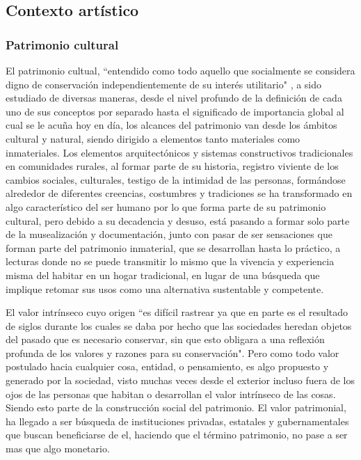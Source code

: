 \subsection{Contexto artístico}
\subsubsection{Patrimonio cultural}
El patrimonio cultual, ``entendido como todo aquello que socialmente se considera digno de conservación independientemente de su interés utilitario" \citep{prats1998concepto}, a sido estudiado de diversas maneras, desde el nivel profundo de la definición de cada uno de sus conceptos por separado hasta el significado de importancia global al cual se le acuña hoy en día, los alcances del patrimonio van desde los ámbitos cultural y natural, siendo dirigido a elementos tanto materiales como inmateriales. Los elementos arquitectónicos y sistemas constructivos tradicionales en comunidades rurales, al formar parte de su historia, registro viviente de los cambios sociales, culturales, testigo de la intimidad de las personas, formándose alrededor de diferentes creencias, costumbres y tradiciones se ha transformado en algo característico del ser humano por lo que forma parte de su patrimonio cultural, pero debido a su decadencia y desuso, está pasando a formar solo parte de la musealización y documentación, junto con pasar de ser sensaciones que forman parte del patrimonio inmaterial, que se desarrollan hasta lo práctico, a lecturas donde no se puede transmitir lo mismo que la vivencia y experiencia misma del habitar en un hogar tradicional, en lugar de una búsqueda que implique retomar sus usos como una alternativa sustentable y competente.

El valor intrínseco cuyo origen ``es difícil rastrear ya que en parte es el resultado de siglos durante los cuales se daba por hecho que las sociedades heredan objetos del pasado que es necesario conservar, sin que esto obligara a una reflexión profunda de los valores y razones para su conservación"\citep{villasenor2011valor}. Pero como todo valor postulado hacia cualquier cosa, entidad, o pensamiento, es algo propuesto y generado por la sociedad, visto muchas veces desde el exterior incluso fuera de los ojos de las personas que habitan o desarrollan el valor intrínseco de las cosas. Siendo esto parte de la construcción social del patrimonio. El valor patrimonial, ha llegado a ser búsqueda de instituciones privadas, estatales y gubernamentales que buscan beneficiarse de el, haciendo que el término patrimonio, no pase a ser mas que algo monetario.

